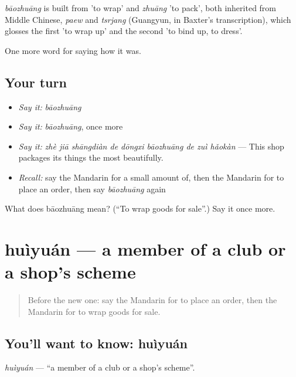 \begin{cousinweb}
\emph{bāozhuāng} is built from  'to wrap' and \emph{zhuāng} 'to pack', both inherited from Middle Chinese, \emph{paew} and \emph{tsrjang} (Guangyun, in Baxter's transcription), which glosses the first 'to wrap up' and the second 'to bind up, to dress'.
\end{cousinweb}

\begin{grammarlens}[title={What you've built}]
One more word for saying how it was.
\end{grammarlens}

\subsection*{Your turn}
\begin{itemize}
\raggedright
  \item \emph{Say it:} \emph{bāozhuāng}
  \item \emph{Say it:} \emph{bāozhuāng}, once more
  \item \emph{Say it:} \emph{zhè jiā shāngdiàn de dōngxi bāozhuāng de zuì hǎokàn} — This shop packages its things the most beautifully.
  \item \emph{Recall:} say the Mandarin for a small amount of, then the Mandarin for to place an order, then say \emph{bāozhuāng} again
\end{itemize}

\begin{tcolorbox}[breakable,colback=teal!4,colframe=teal!35!black,title={Before you move on}]
What does bāozhuāng mean? (\textquotedblleft{}To wrap goods for sale\textquotedblright{}.) Say it once more.
\end{tcolorbox}
\section[huìyuán]{huìyuán — a member of a club or a shop's scheme}

\label{lesson:ZH-C527-huiyuan}



\begin{quote}
Before the new one: say the Mandarin for to place an order, then the Mandarin for to wrap goods for sale.
\end{quote}

\subsection*{You'll want to know: huìyuán}
\emph{huìyuán} — \textquotedblleft{}a member of a club or a shop's scheme\textquotedblright{}.

